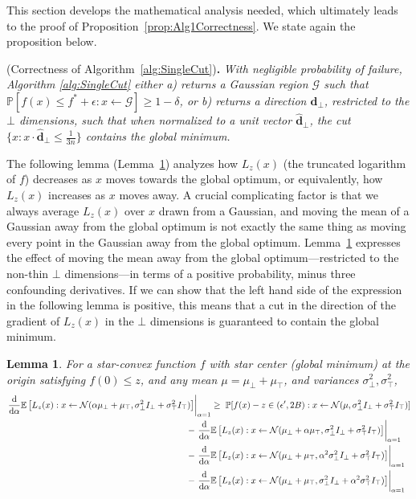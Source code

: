 \documentclass[11pt,letter]{article}
\renewcommand{\Pr}{\mathbb{P}}
\newcommand{\Exp}{\mathbb{E}}
\newcommand{\from}{\leftarrow}
\newcommand{\Normal}{\mathcal{N}}
\renewcommand{\vec}[1]{\mathbf{#1}}
\renewcommand{\d}{\mathrm{d}}
\newcommand{\Diff}[2][]{\frac{\d#1}{\d#2}}
\newcommand{\ferr}{\epsilon}
\newcommand{\perr}{\delta}
\newcounter{nTheorems}
\numberwithin{nTheorems}{section}
\newtheorem{lemma}[nTheorems]{Lemma}
\begin{document}
This section develops the mathematical analysis needed, which ultimately leads to the proof of Proposition~\ref{prop:Alg1Correctness}.
We state again the proposition below.

\medskip{} (Correctness of Algorithm~\ref{alg:SingleCut}){\bf .} \emph{With negligible probability of failure, Algorithm \ref{alg:SingleCut} either a) returns a Gaussian region $\mathcal{G}$ such that $\Pr[f(x) \le f^\ast+\ferr : x \from \mathcal{G}] \ge 1 - \perr$, or b) returns a direction $\vec{d}_\bot$, restricted to the $\bot$ dimensions, such that when normalized to a unit vector $\hat{\vec{d}}_\bot$, the cut $\{x:x\cdot \hat{\vec{d}}_\bot\leq \frac{1}{3n}\}$ contains the global minimum.
}

The following lemma (Lemma~\ref{lem:CutLB}) analyzes how $L_z(x)$ (the truncated logarithm of $f$) decreases as $x$ moves towards the global optimum, or equivalently, how $L_z(x)$ increases as $x$ moves away.
A crucial complicating factor is that we always average $L_z(x)$ over $x$ drawn from a Gaussian, and moving the mean of a Gaussian away from the global optimum is not exactly the same thing as moving every point in the Gaussian away from the global optimum.
Lemma~\ref{lem:CutLB} expresses the effect of moving the mean away from the global optimum---restricted to the non-thin $\bot$ dimensions---in terms of a positive probability, minus three confounding derivatives.
If we can show that the left hand side of the expression in the following lemma is positive, this means that a cut in the direction of the gradient of $L_z(x)$ in the $\bot$ dimensions is guaranteed to contain the global minimum.
\begin{lemma}
\label{lem:CutLB}
For a star-convex function $f$ with star center (global minimum) at the origin satisfying $f(0) \leq z$, and any mean $\mu=\mu_\bot+\mu_\top$, and variances $\sigma_\bot^2,\sigma_\top^2$,
\begin{align*}
\left.\Diff{\alpha} \Exp\left[L_z(x) : x \from \Normal(\alpha \mu_\bot + \mu_\top, \sigma_\bot^2 I_\bot + \sigma_\top^2 I_\top) \right]\right|_{\alpha = 1}\hspace{-1cm}&\hspace{1cm} \ge \;\Pr[f(x)-z\in (\epsilon',2B) : x \from \Normal(\mu, \sigma_\bot^2 I_\bot + \sigma_\top^2 I_\top)]\\
&-\left.\Diff{\alpha} \Exp\left[L_z(x) : x \from \Normal(\mu_\bot +\alpha \mu_\top, \sigma_\bot^2 I_\bot + \sigma_\top^2 I_\top) \right]\right|_{\alpha = 1}\\
&-\left.\Diff{\alpha} \Exp\left[L_z(x) : x \from \Normal(\mu_\bot + \mu_\top, \alpha^2\sigma_\bot^2 I_\bot + \sigma_\top^2 I_\top) \right]\right|_{\alpha = 1}\\
&-\left.\Diff{\alpha} \Exp\left[L_z(x) : x \from \Normal(\mu_\bot + \mu_\top, \sigma_\bot^2 I_\bot + \alpha^2\sigma_\top^2 I_\top) \right]\right|_{\alpha = 1}
\end{align*}
\end{lemma}
\end{document}
